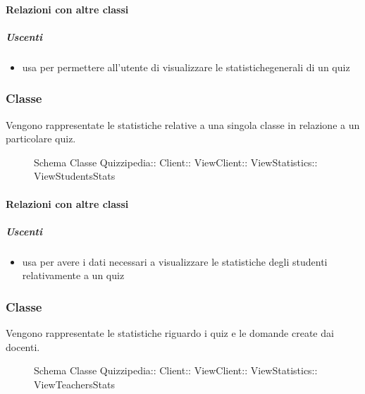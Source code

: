 \paragraph{Relazioni con altre classi}
\subparagraph{Uscenti}
\begin{itemize}
\item usa  per permettere all'utente di visualizzare le statistichegenerali di un quiz
\end{itemize}
\subsubsection{Classe }
Vengono rappresentate le statistiche relative a una singola classe in relazione a un particolare quiz.
\begin{figure}[H]
\centering
\noindent{}
\caption[Schema Classe ViewStudentsStats]{Schema Classe Quizzipedia:: Client:: ViewClient:: ViewStatistics:: ViewStudentsStats}
\end{figure}
\paragraph{Relazioni con altre classi}
\subparagraph{Uscenti}
\begin{itemize}
\item usa  per avere i dati necessari a visualizzare le statistiche degli studenti relativamente a un quiz
\end{itemize}
\subsubsection{Classe }
Vengono rappresentate le statistiche riguardo i quiz e le domande create dai docenti.
\begin{figure}[H]
\centering
\noindent{}
\caption[Schema Classe ViewTeachersStats]{Schema Classe Quizzipedia:: Client:: ViewClient:: ViewStatistics:: ViewTeachersStats}
\end{figure}
